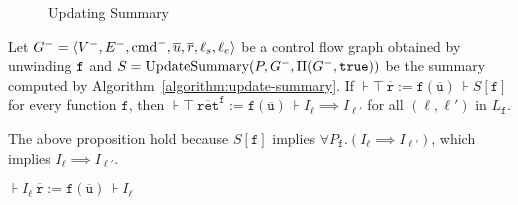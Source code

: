 \begin{figure}
  \centering

  \caption{Updating Summary}
  \label{figure:updating-summary}
\end{figure}

\begin{proposition}
  \label{propposition:strengthen_postcondition}
  Let $G^- = \langle V^-, E^-, \textmd{cmd}^-, \overline{u}, \overline{r},\ell_s,\ell_e \rangle$ be a control flow graph obtained by unwinding $\mathtt{{f}}$ and $S=\textmd{UpdateSummary} (P, G^-,\Pi (G^-, \mathtt{true}))$ be the summary computed by Algorithm~\ref{algorithm:update-summary}.
  If $\assert{\top}\ \mathtt{\overline{r}} :=
    \mathtt{f} (\overline{\mathtt{u}})\ \assert{S[\mathtt{f}]}$ for every
  function $\mathtt{f}$, then $\assert{\top}\ \mathtt{\overline{ret}^f} :=
  \mathtt{f} (\overline{\mathtt{u}})\ \assert{I_\ell \implies I_{\ell'}}$ for all $(\ell,\ell')$ in $L_\mathtt{f}$.
\end{proposition}
The above proposition hold because $S[\mathtt{f}]$ implies $\forall P_\mathtt{f}. (I_\ell \implies I_{\ell'})$, which implies $I_\ell \implies I_{\ell'}$.

\begin{proposition}
\label{propposition:invariant}
$\assert{I_\ell}\ \mathtt{\overline{r}} :=
    \mathtt{f} (\overline{\mathtt{u}})\ \assert{I_\ell}$
\end{proposition}